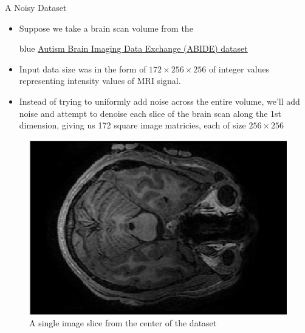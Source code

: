 \documentclass[aspectratio=169,xcolor=dvipsnames]{beamer}
\begin{document}
	
	\begin{frame}{A Noisy Dataset}
		\begin{itemize}
			\item Suppose we take a brain scan volume from the \begin{color}{blue}
				\href{http://fcon_1000.projects.nitrc.org/indi/abide/}{Autism Brain Imaging Data Exchange (ABIDE) dataset}
			\end{color}
			\item Input data size was in the form of $172\times256\times256$ of integer values representing intensity values of MRI signal.
			\item Instead of trying to uniformly add noise across the entire volume, we'll add noise and attempt to denoise each slice of the brain scan along the 1st dimension, giving us 172 square image matricies, each of size $256\times256$
		\end{itemize}
	
		\begin{figure}
			\centering
			\includegraphics[scale=0.25]{BrainScan.png}
			\caption{A single image slice from the center of the dataset}
		\end{figure}
	\end{frame}
	
	
\end{document}
